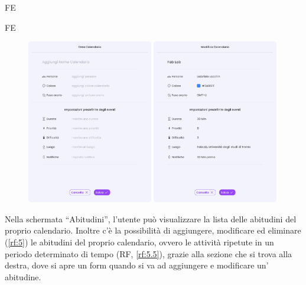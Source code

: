 \begin{listaPersonale}{FE}
\begin{listaPersonale2}{FE}
        \begin{center} 
            \begin{figure}[H]
            \centering\includegraphics[width=0.49\textwidth,height=0.35\textheight]{img/FrontEnd/Eventi/Calendario/CreaCalendario1.png}
            \centering\includegraphics[width=0.49\textwidth,height=0.35\textheight]{img/FrontEnd/Eventi/Calendario/ModificaCalendario.png}
            \end{figure}
        \end{center}
        
    \end{listaPersonale2}
    
     Nella schermata “Abitudini”, l’utente può visualizzare la lista delle abitudini del proprio calendario. Inoltre c’è la possibilità di aggiungere, modificare ed eliminare (\ref{rf:5}) le abitudini del proprio calendario, ovvero le attività ripetute in un periodo determinato di tempo (RF, \ref{rf:5.5}), grazie alla sezione che si trova alla destra, dove si apre un form quando si va ad aggiungere e modificare un’ abitudine.


\end{listaPersonale}

